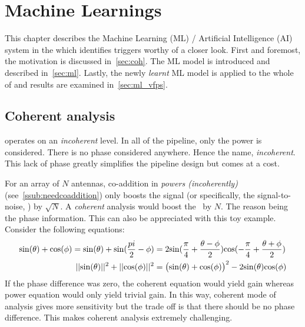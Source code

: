 \chapter{Machine Learnings}
\label{ch:ml}

\par This chapter describes the Machine Learning (ML) / Artificial Intelligence (AI) system in the \vf which identifies triggers worthy of a closer look. First and foremost, the motivation is discussed in~\autoref{sec:coh}.
The ML model is introduced and described in~\autoref{sec:ml}. 
Lastly, the newly \emph{learnt} ML model is applied to the whole of \vfpfs and results are examined in~\autoref{sec:ml_vfps}.

\section {Coherent analysis}
\label{sec:coh}

\par \vf operates on an \emph{incoherent} level. In all of the pipeline, only the power is considered.
There is no phase considered anywhere.
Hence the name, \emph{incoherent}.
This lack of phase greatly simplifies the pipeline design but comes at a cost.

\par For an array of $N$ antennas, co-addition in \emph{powers (incoherently)} (see~\autoref{ssub:needcoaddition}) only boosts the signal (or specifically, the signal-to-noise, \sn) by $\sqrt{N}$. 
A \emph{coherent} analysis would boost the \sn~by $N$. The reason being the phase information.
This can also be appreciated with this toy example. Consider the following equations:
\begin{align*}
{\rm sin} (\theta) + {\rm cos} (\phi) = {\rm sin} (\theta) + {\rm sin} (\frac{pi}{2} - \phi)  &= 2 {\rm sin} (\frac{\pi}{4} + \frac{\theta - \phi}{2}) {\rm cos} (-\frac{\pi}{4} + \frac{\theta + \phi}{2}) \\
|| {\rm sin}(\theta) || ^2  + || {\rm cos}(\phi) || ^2 &= \big( {\rm sin} (\theta) + {\rm cos(\phi)} \big)^2 - 2{\rm sin}(\theta){\rm cos}(\phi)
\end{align*}
If the phase difference was zero, the coherent equation would yield  gain whereas power equation would only yield trivial gain.
In this way, coherent mode of analysis gives more sensitivity but the trade off is that there should be no phase difference. 
This makes coherent analysis extremely challenging.

